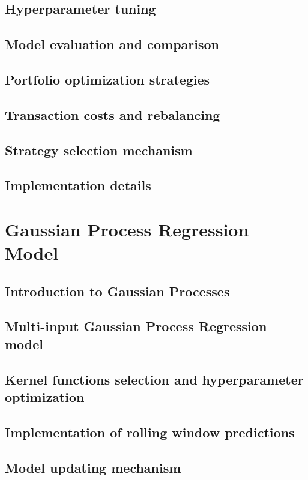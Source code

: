 \subsection{Hyperparameter tuning}
\subsection{Model evaluation and comparison}
\subsection{Portfolio optimization strategies}
\subsection{Transaction costs and rebalancing}
\subsection{Strategy selection mechanism}
\subsection{Implementation details}

\section{Gaussian Process Regression Model}

\subsection{Introduction to Gaussian Processes}
\subsection{Multi-input Gaussian Process Regression model}
\subsection{Kernel functions selection and hyperparameter optimization}
\subsection{Implementation of rolling window predictions}
\subsection{Model updating mechanism}

